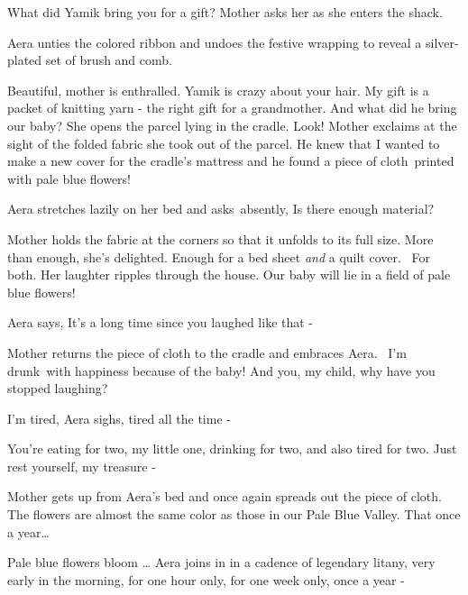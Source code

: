 \documentclass[twoside,11pt]{book}
\begin{document}
{\textquotedbl}What did Yamik bring you for a gift?{\textquotedbl} Mother asks her as she enters the shack. 

Aera unties the colored ribbon and undoes the festive wrapping to reveal a silver-plated set of brush and comb.\ 

{\textquotedbl}Beautiful,{\textquotedbl} mother is enthralled. {\textquotedbl}Yamik is crazy about your hair. My gift is
a packet of knitting yarn - the right gift for a grandmother. And what did he bring our baby?{\textquotedbl} She opens
the parcel lying in the cradle. {\textquotedbl}Look!{\textquotedbl} Mother exclaims at the sight of the folded fabric
she took out of the parcel. {\textquotedbl}He knew that I wanted to make a new cover for the cradle's mattress and he
found a piece of cloth\ printed with pale blue flowers!{\textquotedbl} 

Aera stretches lazily on her bed and asks~absently, {\textquotedbl}Is there enough material?{\textquotedbl}

Mother holds the fabric at the corners so that it unfolds to its full size. {\textquotedbl}More than
enough,{\textquotedbl} she's delighted. {\textquotedbl}Enough for a bed sheet \textit{and }a quilt cover. \ For
both.{\textquotedbl} Her laughter ripples through the house. {\textquotedbl}Our baby will lie in a field of pale blue
flowers!{\textquotedbl} 

Aera says, {\textquotedbl}It's a long time since you laughed like that -{\textquotedbl} 

Mother returns the piece of cloth to the cradle and embraces Aera. ~{\textquotedbl}I'm drunk~with happiness because of
the baby! And you, my child, why have you stopped laughing?{\textquotedbl} 

{\textquotedbl}I'm tired,{\textquotedbl} Aera sighs, {\textquotedbl}tired all the time -{\textquotedbl} 

{\textquotedbl}You're eating for two, my little one, drinking for two, and also tired for two. Just rest yourself, my
treasure -{\textquotedbl}~ 

Mother gets up from Aera's bed and once again spreads out the piece of cloth. {\textquotedbl}The flowers are almost the
same color as those in our Pale Blue Valley. That once a year{\dots}{\textquotedbl} 

{\textquotedbl}Pale blue flowers bloom {\dots}{\textquotedbl} Aera joins in in a cadence of legendary litany,
{\textquotedbl}very early in the morning, for one hour only, for one week only, once a year -{\textquotedbl}
\end{document}
